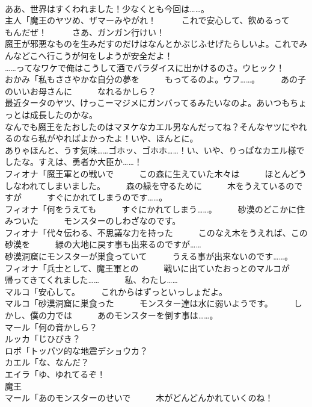\documentclass[8pt]{extreport}
\begin{document}
\begin{CJK}{UTF8}{min}
\\	ああ、世界はすくわれました！少なくとも今回は……。	
\\	主人「魔王のヤツめ、ザマーみやがれ！　　　これで安心して、飮めるって　　　もんだぜ！　　　さあ、ガンガン行けい！	
\\	魔王が邪悪なものを生みだすのだけはなんとかぶじふせげたらしいよ。これでみんなどこへ行こうが何をしようが安全だよ！	
\\	……ってなワケで俺はこうして酒でパラダイスに出かけるのさ。ウヒック！	
\\	おかみ「私もささやかな自分の夢を　　　もってるのよ。ウフ……。　　　あの子のいいお母さんに　　　なれるかしら？	
\\	最近タータのヤツ、けっこーマジメにガンバってるみたいなのよ。あいつもちょっとは成長したのかな。	
\\	なんでも魔王をたおしたのはマヌケなカエル男なんだってね？そんなヤツにやれるのなら私がやればよかったよ！いや、ほんとに。	
\\	ありゃほんと、うす気味……ゴホッ、ゴホホ……！い、いや、りっぱなカエル様でしたな。すえは、勇者か大臣か……！	
\\	フィオナ「魔王軍との戦いで　　　この森に生えていた木々は　　　ほとんどうしなわれてしまいました。　　　森の緑を守るために　　　木をうえているのですが　　　すぐにかれてしまうのです……。	
\\	フィオナ「何をうえても　　　すぐにかれてしまう……。　　　砂漠のどこかに住みついた　　　モンスターのしわざなのです。	
\\	フィオナ「代々伝わる、不思議な力を持った　　　このなえ木をうえれば、この砂漠を　　　緑の大地に戻す事も出来るのですが……	
\\	砂漠洞窟にモンスターが巣食っていて　　　うえる事が出来ないのです……。	
\\	フィオナ「兵士として、魔王軍との　　　戦いに出ていたおっとのマルコが　　　帰ってきてくれました……　　　私、わたし……	
\\	マルコ「安心して。　　　これからはずっといっしょだよ。	
\\	マルコ「砂漠洞窟に巣食った　　　モンスター達は水に弱いようです。　　　しかし、僕の力では　　　あのモンスターを倒す事は……。	
\\	マール「何の音かしら？	
\\	ルッカ「じひびき？	
\\	ロボ「トッパツ的な地震デショウカ？	
\\	カエル「な、なんだ？	
\\	エイラ「ゆ、ゆれてるぞ！	
\\	魔王
\\	マール「あのモンスターのせいで　　　木がどんどんかれていくのね！	

\end{CJK}
\end{document}
